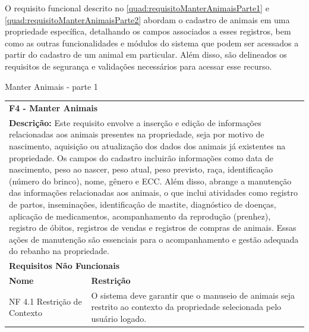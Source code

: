 \clearpage

O requisito funcional descrito no \autoref{quad:requisitoManterAnimaisParte1} e \autoref{quad:requisitoManterAnimaisParte2} abordam o cadastro de animais em uma propriedade específica, detalhando os campos associados a esses registros, bem como as outras funcionalidades e módulos do sistema que podem ser acessados a partir do cadastro de um animal em particular. Além disso, são delineados os requisitos de segurança e validações necessários para acessar esse recurso.

\begin{tabframed}[!htb]
  \caption{Manter Animais - parte 1}
  \label{quad:requisitoManterAnimaisParte1}
  \renewcommand{\arraystretch}{1.5}
  \begin{tabular}{|l|l|}
    \cline{1-2}
    \multicolumn{2}{|l|}{\textbf{F4 - Manter Animais}}
    \\ \cline{1-2}

    \multicolumn{2}{|p{15cm}|}{
    \raggedright \textbf{Descrição:} Este requisito envolve a inserção e edição de informações relacionadas aos animais presentes na propriedade, seja por motivo de nascimento, aquisição ou atualização dos dados dos animais já existentes na propriedade. Os campos do cadastro incluirão informações como data de nascimento, peso ao nascer, peso atual, peso previsto, raça, identificação (número do brinco), nome, gênero e \gls{ECC}.
    Além disso, abrange a manutenção das informações relacionadas aos animais, o que inclui atividades como registro de partos, inseminações, identificação de mastite, diagnóstico de doenças, aplicação de medicamentos, acompanhamento da reprodução (prenhez), registro de óbitos, registros de vendas e registros de compras de animais. Essas ações de manutenção são essenciais para o acompanhamento e gestão adequada do rebanho na propriedade.
    }
    \\ \cline{1-2}

    \multicolumn{2}{|l|}{\textbf{Requisitos Não Funcionais}}
    \\ \cline{1-2}

    \textbf{Nome} &
    \textbf{Restrição}
    \\ \cline{1-2}

    \multicolumn{1}{|p{3cm}|}{\raggedright NF 4.1 Restrição de Contexto}
                  &
    \multicolumn{1}{|p{12cm}|}{\raggedright O sistema deve garantir que o manuseio de animais seja restrito ao contexto da propriedade selecionada pelo usuário logado.}
    \\ \cline{1-2}


\end{tabular}
\end{tabframed}
